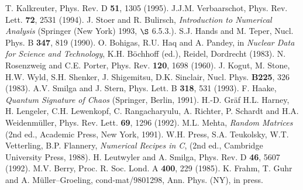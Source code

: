 \begin{references}
        T. Kalkreuter, Phys. Rev. D {\bf 51}, 1305 (1995).
     J.J.M. Verbaarschot, Phys. Rev. Lett. {\bf 72},
                        2531 (1994).
        J. Stoer and R. Bulirsch,
                        {\em Introduction to Numerical Analysis}
                        (Springer (New York) 1993, $\S$ 6.5.3.).
       S.J. Hands and M. Teper,
                        Nucl. Phys. B {\bf 347}, 819 (1990).
     O. Bohigas, R.U. Haq and A. Pandey, in {\em
                        Nuclear Data for Science and Technology},
                        K.H. B\"ochhoff (ed.), Reidel, Dordrecht (1983).
       N. Rosenzweig and C.E. Porter, Phys. Rev.
                        {\bf 120}, 1698 (1960).
       J. Kogut, M. Stone, H.W. Wyld, S.H. Shenker,
                        J. Shigemitsu, D.K. Sinclair,
                        Nucl. Phys. {\bf B225}, 326 (1983).
      A.V. Smilga and J. Stern, Phys. Lett. B {\bf 318},
                        531 (1993).
         F. Haake, {\em Quantum Signature of Chaos}
                        (Springer, Berlin, 1991).
       H.-D. Gr\"af H.L. Harney, H. Lengeler,
                        C.H. Lewenkopf, C. Rangacharyulu, A. Richter,
                        P. Schardt and H.A. Weidenm\"uller,
                        Phys. Rev. Lett. {\bf 69}, 1296 (1992).
         M.L. Mehta, {\it Random Matrices} (2nd ed.,
                        Academic Press, New York, 1991).
            W.H. Press, S.A. Teukolsky, W.T. Vetterling, 
                        B.P. Flannery,
                        {\it Numerical Recipes in C},
                        (2nd ed., Cambridge University Press, 1988).
    H. Leutwyler and  A. Smilga, Phys. Rev. D {\bf 46},
                        5607 (1992).
       M.V. Berry, Proc. R. Soc. Lond. A {\bf 400},
                        229 (1985).
       K. Frahm, T. Guhr and A. M\"uller--Groeling,
                        cond-mat/9801298, Ann. Phys. (NY), in press.
\end{references}

\newpage


